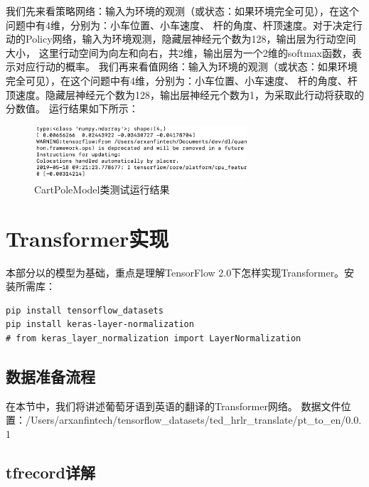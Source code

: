 \documentclass{article}
\begin{document}
我们先来看策略网络：输入为环境的观测（或状态：如果环境完全可见），在这个问题中有4维，分别为：小车位置、小车速度、
杆的角度、杆顶速度。对于决定行动的Policy网络，输入为环境观测，隐藏层神经元个数为128，输出层为行动空间大小，
这里行动空间为向左和向右，共2维，输出层为一个2维的softmax函数，表示对应行动的概率。\newline
我们再来看值网络：输入为环境的观测（或状态：如果环境完全可见），在这个问题中有4维，分别为：小车位置、小车速度、
杆的角度、杆顶速度。隐藏层神经元个数为128，输出层神经元个数为1，为采取此行动将获取的分数值。\newline
运行结果如下所示：
\begin{figure}[H]
    \caption{CartPoleModel类测试运行结果}
    \label{f000073}
    \centering
    \includegraphics[height=2cm]{images/f000073}
\end{figure}


\section{Transformer实现}
本部分以\cite{r000005}的模型为基础，重点是理解TensorFlow 2.0下怎样实现Transformer。安装所需库：
\lstset{language=BASH}
\begin{lstlisting}
pip install tensorflow_datasets
pip install keras-layer-normalization
# from keras_layer_normalization import LayerNormalization
\end{lstlisting}
\subsection{数据准备流程}
在本节中，我们将讲述葡萄牙语到英语的翻译的Transformer网络。
数据文件位置：/Users/arxanfintech/tensorflow\_datasets/ted\_hrlr\_translate/pt\_to\_en/0.0.1
\subsection{tfrecord详解}
\end{document}

